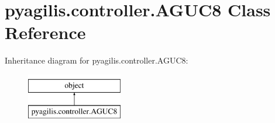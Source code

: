 \hypertarget{classpyagilis_1_1controller_1_1_a_g_u_c8}{}\section{pyagilis.\+controller.\+A\+G\+U\+C8 Class Reference}
\label{classpyagilis_1_1controller_1_1_a_g_u_c8}
Inheritance diagram for pyagilis.\+controller.\+A\+G\+U\+C8\+:\begin{figure}[H]
\begin{center}
\leavevmode
\includegraphics[height=2.000000cm]{classpyagilis_1_1controller_1_1_a_g_u_c8}
\end{center}
\end{figure}
